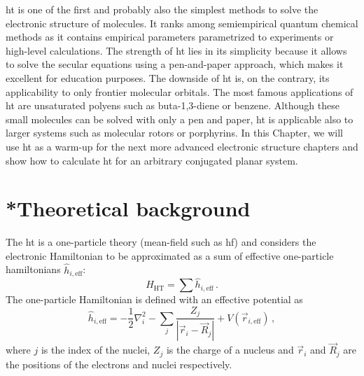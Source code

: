 \acrfull{ht} is one of the first and probably also the simplest methods to solve the electronic structure of molecules. It ranks among semiempirical quantum chemical methods as it contains empirical parameters parametrized to experiments or high-level calculations. The strength of \acrshort{ht} lies in its simplicity because it allows to solve the secular equations using a pen-and-paper approach, which makes it excellent for education purposes. The downside of \acrshort{ht} is, on the contrary, its applicability to only frontier molecular orbitals. The most famous applications of \acrshort{ht} are unsaturated polyens such as buta-1,3-diene or benzene. Although these small molecules can be solved with only a pen and paper, \acrshort{ht} is applicable also to larger systems such as molecular rotors or porphyrins. In this Chapter, we will use \acrshort{ht} as a warm-up for the next more advanced electronic structure chapters and show how to calculate \acrshort{ht} for an arbitrary conjugated planar system.

\section{*Theoretical background}

The \acrshort{ht} is a one-particle theory (mean-field such as \acrlong{hf}) and considers the electronic Hamiltonian to be approximated as a sum of effective one-particle hamiltonians $\hat{h}_{i, \mathrm{eff}}$:
\begin{equation}
\hat{H}_{\mathrm{HT}}= \sum \hat{h}_{i, \mathrm{eff}} \, .
\label{eq:huckel1}
\end{equation}
The one-particle Hamiltonian is defined with an effective potential as
\begin{equation}
\hat{h}_{i, \mathrm{eff}}  = -\frac{1}{2}\nabla_i^2  - \sum_j \frac{Z_j}{|\Vec{r}_i - \Vec{R}_j|} + V(\Vec{r}_{i, \mathrm{eff}})  \, ,
\label{eq:huckel2}
\end{equation}
where $j$ is the index of the nuclei, $Z_j$ is the charge of a nucleus and $\Vec{r}_i$ and $\Vec{R}_j$ are the positions of the electrons and nuclei respectively.

